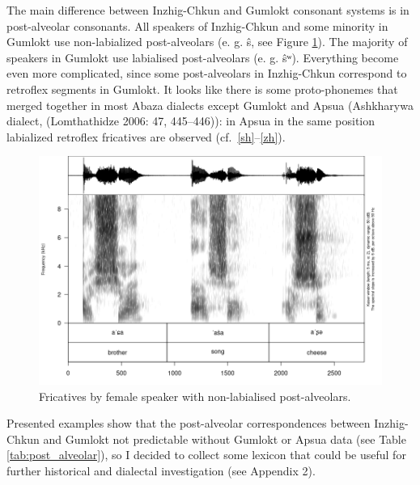 \documentclass[
]{article}
\begin{document}
The main difference between Inzhig-Chkun and Gumlokt consonant systems
is in post-alveolar consonants. All speakers of Inzhig-Chkun and some
minority in Gumlokt use non-labialized post-alveolars (e. g. ŝ, see
Figure \ref{fig:sibilants-d28}). The majority of speakers in Gumlokt use
labialised post-alveolars (e. g. ŝʷ). Everything become even more
complicated, since some post-alveolars in Inzhig-Chkun correspond to
retroflex segments in Gumlokt. It looks like there is some
proto-phonemes that merged together in most Abaza dialects except
Gumlokt and Apsua (Ashkharywa dialect, (Lomthathidze 2006: 47,
445--446)): in Apsua in the same position labialized retroflex
fricatives are observed (cf.~\ref{sh}--\ref{zh}).


\begin{figure}

{\centering \includegraphics[width=6in]{images/03_d28_fricatives} 

}

\caption{Fricatives by female speaker with non-labialised post-alveolars.}\label{fig:sibilants-d28}
\end{figure}

Presented examples show that the post-alveolar correspondences between
Inzhig-Chkun and Gumlokt not predictable without Gumlokt or Apsua data
(see Table \ref{tab:post_alveolar}), so I decided to collect some
lexicon that could be useful for further historical and dialectal
investigation (see Appendix 2).
\end{document}
